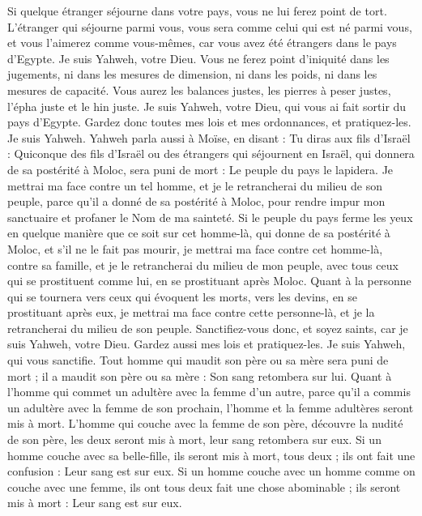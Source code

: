 \begin{multicols}{2}
Si quelque étranger séjourne dans votre pays, vous ne lui ferez point de tort.
L'étranger qui séjourne parmi vous, vous sera comme celui qui est né parmi vous, et vous l'aimerez comme vous-mêmes, car vous avez été étrangers dans le pays d'Egypte. Je suis Yahweh, votre Dieu.
Vous ne ferez point d'iniquité dans les jugements, ni dans les mesures de dimension, ni dans les poids, ni dans les mesures de capacité.
Vous aurez les balances justes, les pierres à peser justes, l'épha juste et le hin juste. Je suis Yahweh, votre Dieu, qui vous ai fait sortir du pays d'Egypte.
Gardez donc toutes mes lois et mes ordonnances, et pratiquez-les. Je suis Yahweh.
\VerseOne{}Yahweh parla aussi à Moïse, en disant :
Tu diras aux fils d'Israël : Quiconque des fils d'Israël ou des étrangers qui séjournent en Israël, qui donnera de sa postérité à Moloc, sera puni de mort : Le peuple du pays le lapidera.
Je mettrai ma face contre un tel homme, et je le retrancherai du milieu de son peuple, parce qu'il a donné de sa postérité à Moloc, pour rendre impur mon sanctuaire et profaner le Nom de ma sainteté.
Si le peuple du pays ferme les yeux en quelque manière que ce soit sur cet homme-là, qui donne de sa postérité à Moloc, et s’il ne le fait pas mourir,
je mettrai ma face contre cet homme-là, contre sa famille, et je le retrancherai du milieu de mon peuple, avec tous ceux qui se prostituent comme lui, en se prostituant après Moloc.
Quant à la personne qui se tournera vers ceux qui évoquent les morts, vers les devins, en se prostituant après eux, je mettrai ma face contre cette personne-là, et je la retrancherai du milieu de son peuple.
Sanctifiez-vous donc, et soyez saints, car je suis Yahweh, votre Dieu.
Gardez aussi mes lois et pratiquez-les. Je suis Yahweh, qui vous sanctifie.
Tout homme qui maudit son père ou sa mère sera puni de mort ; il a maudit son père ou sa mère : Son sang retombera sur lui.
Quant à l'homme qui commet un adultère avec la femme d'un autre, parce qu'il a commis un adultère avec la femme de son prochain, l'homme et la femme adultères seront mis à mort.
L'homme qui couche avec la femme de son père, découvre la nudité de son père, les deux seront mis à mort, leur sang retombera sur eux.
Si un homme couche avec sa belle-fille, ils seront mis à mort, tous deux ; ils ont fait une confusion : Leur sang est sur eux.
Si un homme couche avec un homme comme on couche avec une femme, ils ont tous deux fait une chose abominable ; ils seront mis à mort : Leur sang est sur eux.

\end{multicols}
